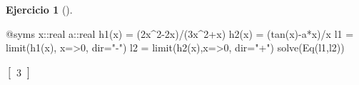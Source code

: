 \documentclass[
  a4paper,
]{scrreport}
\newenvironment{Shaded}{\begin{snugshade}}{\end{snugshade}}
\newcommand{\DataTypeTok}[1]{\textcolor[rgb]{0.68,0.00,0.00}{#1}}
\newcommand{\FloatTok}[1]{\textcolor[rgb]{0.68,0.00,0.00}{#1}}
\newcommand{\FunctionTok}[1]{\textcolor[rgb]{0.28,0.35,0.67}{#1}}
\newcommand{\NormalTok}[1]{\textcolor[rgb]{0.00,0.23,0.31}{#1}}
\newcommand{\OperatorTok}[1]{\textcolor[rgb]{0.37,0.37,0.37}{#1}}
\newcommand{\PreprocessorTok}[1]{\textcolor[rgb]{0.68,0.00,0.00}{#1}}
\newcommand{\StringTok}[1]{\textcolor[rgb]{0.13,0.47,0.30}{#1}}
\theoremstyle{definition}
\newtheorem{exercise}{Ejercicio}[chapter]
\theoremstyle{remark}
\begin{document}
\begin{exercise}[]
\begin{tcolorbox}
\begin{Shaded}
\begin{Highlighting}[]
\PreprocessorTok{@syms}\NormalTok{ x}\OperatorTok{::}\DataTypeTok{real }\NormalTok{a}\OperatorTok{::}\DataTypeTok{real}
\FunctionTok{h1}\NormalTok{(x) }\OperatorTok{=}\NormalTok{ (}\FloatTok{2}\NormalTok{x}\OperatorTok{\^{}}\FloatTok{2}\OperatorTok{{-}}\FloatTok{2}\NormalTok{x)}\OperatorTok{/}\NormalTok{(}\FloatTok{3}\NormalTok{x}\OperatorTok{\^{}}\FloatTok{2}\OperatorTok{+}\NormalTok{x)}
\FunctionTok{h2}\NormalTok{(x) }\OperatorTok{=}\NormalTok{ (}\FunctionTok{tan}\NormalTok{(x)}\OperatorTok{{-}}\NormalTok{a}\OperatorTok{*}\NormalTok{x)}\OperatorTok{/}\NormalTok{x }
\NormalTok{l1 }\OperatorTok{=} \FunctionTok{limit}\NormalTok{(}\FunctionTok{h1}\NormalTok{(x), x}\OperatorTok{=\textgreater{}}\FloatTok{0}\NormalTok{, dir}\OperatorTok{=}\StringTok{"{-}"}\NormalTok{)}
\NormalTok{l2 }\OperatorTok{=} \FunctionTok{limit}\NormalTok{(}\FunctionTok{h2}\NormalTok{(x),x}\OperatorTok{=\textgreater{}}\FloatTok{0}\NormalTok{, dir}\OperatorTok{=}\StringTok{"+"}\NormalTok{)}
\FunctionTok{solve}\NormalTok{(}\FunctionTok{Eq}\NormalTok{(l1,l2))}
\end{Highlighting}
\end{Shaded}

$\left[ \begin{array}{r}3\end{array} \right]$

\end{tcolorbox}

\end{exercise}
\end{document}
